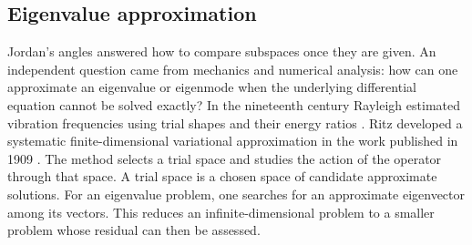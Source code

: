 \documentclass[pdflatex]{sn-jnl} %
\theoremstyle{thmstyleone}
\begin{document}
\subsection{Eigenvalue approximation}
\label{sec:related-ritz-weyl}

Jordan's angles answered how to compare subspaces once they are given.
An independent question came from mechanics and numerical analysis:
how can one approximate an eigenvalue or eigenmode when the underlying
differential equation cannot be solved exactly?  In the nineteenth
century Rayleigh estimated vibration frequencies using trial shapes
and their energy ratios \citep{rayleigh1877sound}.  Ritz developed a systematic finite-dimensional
variational approximation in the work published in 1909
\citep{ritz1909variations,leissa2005historical}.  The method selects
a trial space and studies the action of the operator through that
space. A trial space is a chosen space of candidate approximate solutions.
For an eigenvalue problem, one searches for an approximate eigenvector among
its vectors. This reduces an infinite-dimensional problem to a smaller
problem whose residual can then be assessed.
\end{document}
